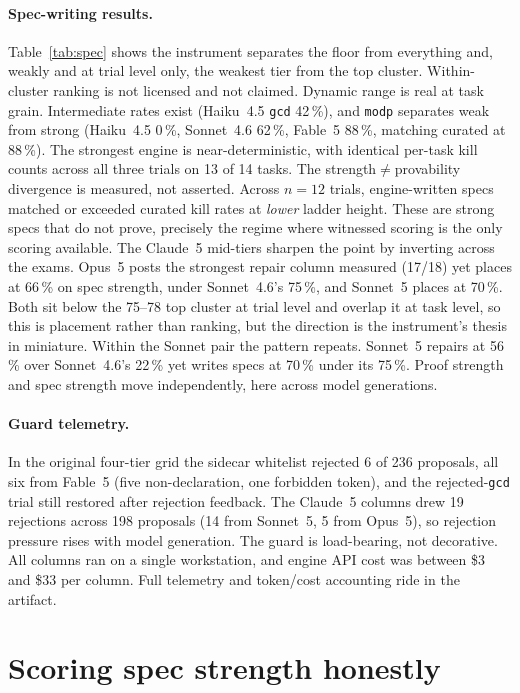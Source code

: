 \documentclass{article}
\newcommand{\ehaiku}{Haiku~4.5}
\newcommand{\esonnet}{Sonnet~4.6}
\newcommand{\efable}{Fable~5}
\begin{document}
\paragraph{Spec-writing results.} Table~\ref{tab:spec} shows the
instrument separates the floor from everything and, weakly and at trial
level only, the weakest tier from the top cluster. Within-cluster ranking
is not licensed and not claimed. Dynamic range is real at task grain.
Intermediate rates exist (\ehaiku{} \texttt{gcd} 42\,\%), and
\texttt{modp} separates weak from strong (\ehaiku{} 0\,\%, \esonnet{}
62\,\%, \efable{} 88\,\%, matching curated at 88\,\%). The strongest
engine is near-deterministic, with identical per-task kill counts across
all three trials on 13 of 14 tasks. The strength$\neq$provability
divergence is measured, not asserted. Across $n{=}12$ trials,
engine-written specs matched or exceeded curated kill rates at
\emph{lower} ladder height. These are strong specs that do not prove,
precisely the regime where witnessed scoring is the only scoring
available. The Claude~5 mid-tiers sharpen the point by inverting across
the exams. Opus~5 posts the strongest repair column measured (17/18) yet
places at 66\,\% on spec strength, under \esonnet{}'s 75\,\%, and
Sonnet~5 places at 70\,\%. Both sit below the 75--78 top cluster at
trial level and overlap it at task level, so this is placement rather
than ranking, but the direction is the instrument's thesis in miniature.
Within the Sonnet pair the pattern repeats. Sonnet~5 repairs at 56\,\%
over \esonnet{}'s 22\,\% yet writes specs at 70\,\% under its 75\,\%.
Proof strength and spec strength move independently, here across model
generations.

\paragraph{Guard telemetry.} In the original four-tier grid the sidecar
whitelist rejected 6 of 236 proposals, all six from \efable{} (five
non-declaration, one forbidden token), and the rejected-\texttt{gcd}
trial still restored after rejection feedback. The Claude~5 columns drew
19 rejections across 198 proposals (14 from Sonnet~5, 5 from Opus~5), so
rejection pressure rises with model generation. The guard is
load-bearing, not decorative. All columns ran on a single workstation,
and engine API cost was between \$3 and \$33 per column. Full telemetry
and token/cost accounting ride in the artifact.

\section{Scoring spec strength honestly}
\label{sec:refuters}
\end{document}
